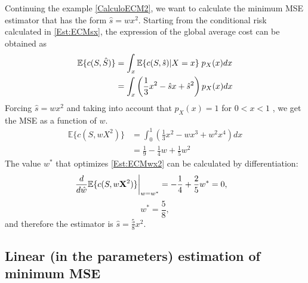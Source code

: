 \begin{example}
\label{CalculoECM_rest}

Continuing the example \ref{CalculoECM2}, we want to calculate the minimum MSE estimator that has the form $\hat{s} = wx^2$. Starting from the conditional risk calculated in \eqref{Est:ECMsx}, the expression of the global average cost can be obtained as
\begin{align}
\label{ec:coste_medio2}
\mathbb{E}\{c(S,\hat S)\} 
   &= \int_x \mathbb{E}\{c(S,\hat s)|X=x\} \;p_X(x) dx  \\
   &= \int_x \left(\frac{1}{3}x^2 -\hat{s}x +\hat{s}^2 \right) 
                   p_X(x) dx
\end{align}
Forcing $\hat{s} = wx^2$ and taking into account that $p_X(x)=1$ for $ 0<x<1$ , we get the MSE as a function of $w$.
\begin{align}
\mathbb{E}\{c(S,wX^2)\} 
   & = \int_0^1 \left(\frac{1}{3}x^2 - wx^3 + w^2x^4 \right) dx \\
   & = \frac{1}{9} - \frac{1}{4} w + \frac{1}{5} w^2
\label{Est:ECMwx2}
\end{align}
The value $w^*$ that optimizes \eqref{Est:ECMwx2} can be calculated by differentiation:
\begin{align}
\left. \frac{d}{d\hat{w}} \mathbb{E}\{c(S,w{\bf X}^2)\} \right|_{w=w^*} 
    &= - \frac{1}{4} + \frac{2}{5} w^* =0,
\end{align}
\begin{equation}
\label{eq:sopt_58}
w^* = \frac{5}{8},
\end{equation}
and therefore the estimator is $\hat{s} = \frac{5}{8}x^2$.

\end{example}\vspace{0.4cm}


\subsection{Linear (in the parameters) estimation of minimum MSE}
\label{sec:est_lineal}

